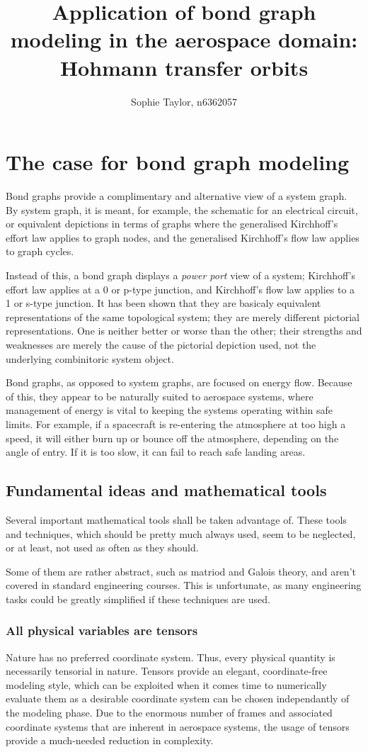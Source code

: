 \documentclass[utf,a4paper,12pt]{report}
\title{Application of bond graph modeling in the aerospace domain: Hohmann transfer orbits}
\author{Sophie Taylor, n6362057}
\begin{document}
\maketitle
\tableofcontents

\chapter{The case for bond graph modeling}
Bond graphs provide a complimentary and alternative view of a system graph. By system graph, it is meant, for example, the schematic for an electrical circuit, or equivalent depictions in terms of graphs where the generalised Kirchhoff's effort law applies to graph nodes, and the generalised Kirchhoff's flow law applies to graph cycles.

 Instead of this, a bond graph displays a \emph{power port} view of a system; Kirchhoff's effort law applies at a 0 or p-type junction, and Kirchhoff's flow law applies to a 1 or s-type junction. It has been shown that they are basicaly equivalent representations of the same topological system; they are merely different pictorial representations. One is neither better or worse than the other; their strengths and weaknesses are merely the cause of the pictorial depiction used, not the underlying combinitoric system object.

Bond graphs, as opposed to system graphs, are focused on energy flow. Because of this, they appear to be naturally suited to aerospace systems, where management of energy is vital to keeping the systems operating within safe limits. For example, if a spacecraft is re-entering the atmosphere at too high a speed, it will either burn up or bounce off the atmosphere, depending on the angle of entry. If it is too slow, it can fail to reach safe landing areas.
\section{Fundamental ideas and mathematical tools}
Several important mathematical tools shall be taken advantage of. These tools and techniques, which should be pretty much always used, seem to be neglected, or at least, not used as often as they should.

Some of them are rather abstract, such as matriod and Galois theory, and aren't covered in standard engineering courses. This is unfortunate, as many engineering tasks could be greatly simplified if these techniques are used.
\subsection{All physical variables are tensors}
Nature has no preferred coordinate system. Thus, every physical quantity is necessarily tensorial in nature. Tensors provide an elegant, coordinate-free modeling style, which can be exploited when it comes time to numerically evaluate them as a desirable coordinate system can be chosen independantly of the modeling phase. Due to the enormous number of frames and associated coordinate systems that are inherent in aerospace systems, the usage of tensors provide a much-needed reduction in complexity.
\end{document}
